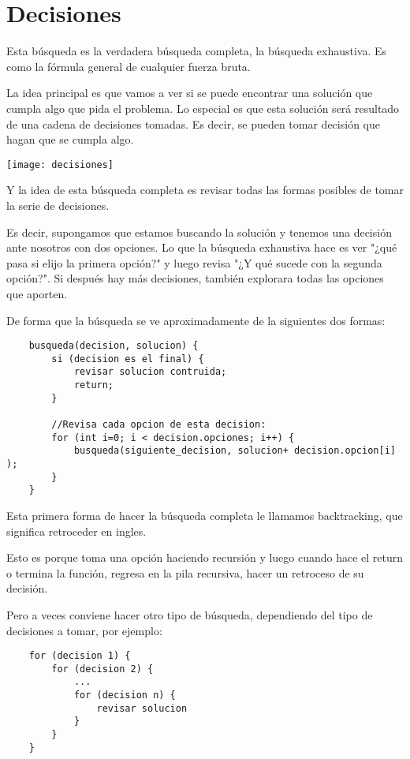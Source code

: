 \chapter*{Decisiones}
\label{decision}

Esta búsqueda es la verdadera búsqueda completa, la búsqueda exhaustiva. Es como la fórmula general de cualquier fuerza bruta.

La idea principal es que vamos a ver si se puede encontrar una solución que cumpla algo que pida el problema. Lo especial es que esta solución será resultado de una cadena de decisiones tomadas. Es decir, se pueden tomar decisión que hagan que se cumpla algo. 


\begin{center}
	\texttt{[image: decisiones]}
\end{center}

Y la idea de esta búsqueda completa es revisar todas las formas posibles de tomar la serie de decisiones. 

Es decir, supongamos que estamos buscando la solución y tenemos una decisión ante nosotros con dos opciones. Lo que la búsqueda exhaustiva hace es ver "¿qué pasa si elijo la primera opción?" y luego revisa "¿Y qué sucede con la segunda opción?". Si después hay más decisiones, también explorara todas las opciones que aporten.

De forma que la búsqueda se ve aproximadamente de la siguientes dos formas:


\begin{lstlisting}
	busqueda(decision, solucion) {
		si (decision es el final) {
			revisar solucion contruida;
			return;
		}
	
		//Revisa cada opcion de esta decision:
		for (int i=0; i < decision.opciones; i++) {
			busqueda(siguiente_decision, solucion+ decision.opcion[i] );
		}
	}
\end{lstlisting}


Esta primera forma de hacer la búsqueda completa le llamamos backtracking, que significa retroceder en ingles.

Esto es porque toma una opción haciendo recursión y luego cuando hace el return o termina la función, regresa en la pila recursiva, hacer un retroceso  de su decisión.

Pero a veces conviene hacer otro tipo de búsqueda, dependiendo del tipo de decisiones a tomar, por ejemplo:

\begin{lstlisting}
	for (decision 1) {
		for (decision 2) {
			...
			for (decision n) {
				revisar solucion
			}
		}
	}
\end{lstlisting}

